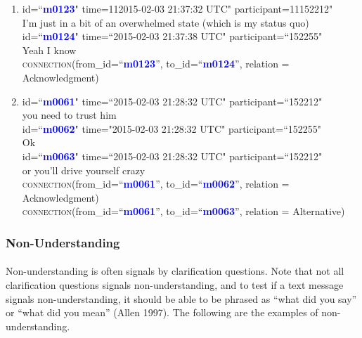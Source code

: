 \documentclass{article}
\begin{document}
\begin{enumerate}[resume]
\item id=``\textbf{\textcolor{blue}{m0123}}" time=112015-02-03 21:37:32 UTC" participant=11152212"\\
I’m just in a bit of an overwhelmed state (which is my status quo)\\
id=``\textbf{\textcolor{blue}{m0124}}" time=``2015-02-03 21:37:38 UTC" participant=``152255"\\
Yeah I know\\
\textsc{connection}(from\_id=``\textbf{\textcolor{blue}{m0123}}'', to\_id=``\textbf{\textcolor{blue}{m0124}}'', relation = Acknowledgment)\\
\item id=``\textbf{\textcolor{blue}{m0061}}" time=``2015-02-03 21:28:32 UTC" participant=``152212"\\
you need to trust him\\
id=``\textbf{\textcolor{blue}{m0062}}" time="2015-02-03 21:28:32 UTC" participant=``152255"\\
Ok\\
id=``\textbf{\textcolor{blue}{m0063}}" time=``2015-02-03 21:28:32 UTC" participant=``152212"\\
or you’ll drive yourself crazy\\
\textsc{connection}(from\_id=``\textbf{\textcolor{blue}{m0061}}'', to\_id=``\textbf{\textcolor{blue}{m0062}}'', relation = Acknowledgment)\\
\textsc{connection}(from\_id=``\textbf{\textcolor{blue}{m0061}}'', to\_id=``\textbf{\textcolor{blue}{m0063}}'', relation = Alternative)
\end{enumerate}

\subsubsection{Non-Understanding}
\paragraph{}
Non-understanding is often signals by clarification questions. Note that not all clarification questions signals non-understanding, and to test if a text message signals non-understanding, it should be able to be phrased as ``what did you say'' or ``what did you mean'' (Allen 1997). The following are the examples of non-understanding. 
\end{document}
